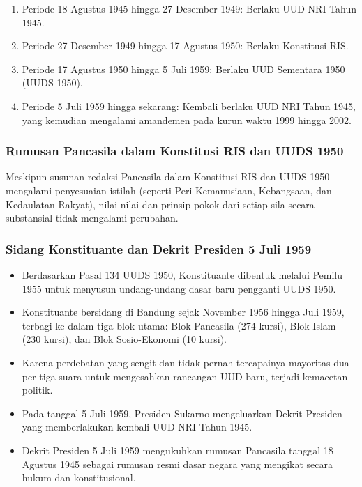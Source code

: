 \begin{enumerate}
\item Periode 18 Agustus 1945 hingga 27 Desember 1949: Berlaku UUD NRI Tahun 1945.
\item Periode 27 Desember 1949 hingga 17 Agustus 1950: Berlaku Konstitusi RIS.
\item Periode 17 Agustus 1950 hingga 5 Juli 1959: Berlaku UUD Sementara 1950 (UUDS 1950).
\item Periode 5 Juli 1959 hingga sekarang: Kembali berlaku UUD NRI Tahun 1945, yang kemudian mengalami amandemen pada kurun waktu 1999 hingga 2002.
\end{enumerate}

\subsubsection{Rumusan Pancasila dalam Konstitusi RIS dan UUDS 1950}

Meskipun susunan redaksi Pancasila dalam Konstitusi RIS dan UUDS 1950 mengalami penyesuaian istilah (seperti Peri Kemanusiaan, Kebangsaan, dan Kedaulatan Rakyat), nilai-nilai dan prinsip pokok dari setiap sila secara substansial tidak mengalami perubahan.

\subsubsection{Sidang Konstituante dan Dekrit Presiden 5 Juli 1959}

\begin{itemize}
\item Berdasarkan Pasal 134 UUDS 1950, Konstituante dibentuk melalui Pemilu 1955 untuk menyusun undang-undang dasar baru pengganti UUDS 1950.
\item Konstituante bersidang di Bandung sejak November 1956 hingga Juli 1959, terbagi ke dalam tiga blok utama: Blok Pancasila (274 kursi), Blok Islam (230 kursi), dan Blok Sosio-Ekonomi (10 kursi).
\item Karena perdebatan yang sengit dan tidak pernah tercapainya mayoritas dua per tiga suara untuk mengesahkan rancangan UUD baru, terjadi kemacetan politik.
\item Pada tanggal 5 Juli 1959, Presiden Sukarno mengeluarkan Dekrit Presiden yang memberlakukan kembali UUD NRI Tahun 1945.
\item Dekrit Presiden 5 Juli 1959 mengukuhkan rumusan Pancasila tanggal 18 Agustus 1945 sebagai rumusan resmi dasar negara yang mengikat secara hukum dan konstitusional.
\end{itemize}

